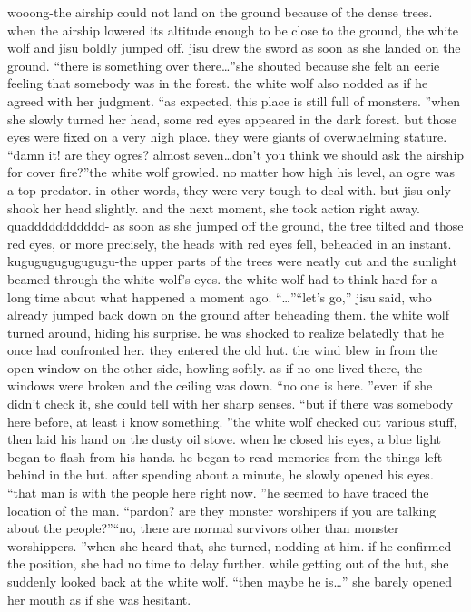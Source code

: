wooong-the airship could not land on the ground because of the dense trees.
 when the airship lowered its altitude enough to be close to the ground, the white wolf and jisu boldly jumped off.
jisu drew the sword as soon as she landed on the ground.
“there is something over there…”she shouted because she felt an eerie feeling that somebody was in the forest.
 the white wolf also nodded as if he agreed with her judgment.
“as expected, this place is still full of monsters.
”when she slowly turned her head, some red eyes appeared in the dark forest.
but those eyes were fixed on a very high place.
 they were giants of overwhelming stature.
“damn it! are they ogres? almost seven…don’t you think we should ask the airship for cover fire?”the white wolf growled.
 no matter how high his level, an ogre was a top predator.
 in other words, they were very tough to deal with.
but jisu only shook her head slightly.
and the next moment, she took action right away.
quaddddddddddd-
as soon as she jumped off the ground, the tree tilted and those red eyes, or more precisely, the heads with red eyes fell, beheaded in an instant.
kugugugugugugugu-the upper parts of the trees were neatly cut and the sunlight beamed through the white wolf’s eyes.
 the white wolf had to think hard for a long time about what happened a moment ago.
“…”“let’s go,” jisu said, who already jumped back down on the ground after beheading them.
the white wolf turned around, hiding his surprise.
 he was shocked to realize belatedly that he once had confronted her.
they entered the old hut.
the wind blew in from the open window on the other side, howling softly.
as if no one lived there, the windows were broken and the ceiling was down.
“no one is here.
”even if she didn’t check it, she could tell with her sharp senses.
“but if there was somebody here before, at least i know something.
”the white wolf checked out various stuff, then laid his hand on the dusty oil stove.
when he closed his eyes, a blue light began to flash from his hands.
he began to read memories from the things left behind in the hut.
after spending about a minute, he slowly opened his eyes.
“that man is with the people here right now.
”he seemed to have traced the location of the man.
“pardon? are they monster worshipers if you are talking about the people?”“no, there are normal survivors other than monster worshippers.
”when she heard that, she turned, nodding at him.
 if he confirmed the position, she had no time to delay further.
 while getting out of the hut, she suddenly looked back at the white wolf.
“then maybe he is…” she barely opened her mouth as if she was hesitant.
